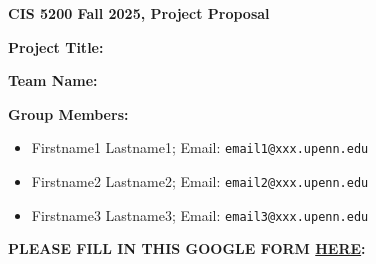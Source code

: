 \documentclass[english]{article}
\begin{document}
\begin{center}
    \textbf{\Large CIS 5200 Fall 2025, Project Proposal}
\end{center}



\vspace{15pt}



\textbf{\Large{Project Title:}}

\vspace{1cm}

\textbf{Team Name:}

\vspace{5mm}

\textbf{Group Members:}

\begin{itemize}
 \item Firstname1 Lastname1; Email: \texttt{email1@xxx.upenn.edu}
 \item Firstname2 Lastname2; Email: \texttt{email2@xxx.upenn.edu}
 \item Firstname3 Lastname3; Email: \texttt{email3@xxx.upenn.edu} 
\end{itemize}

\vspace{8pt}

\textbf{PLEASE FILL IN THIS GOOGLE FORM \href{https://forms.gle/vnLS6B4Szebq8NiN7}{HERE}:}




\vspace{1cm}

\hline


\end{document}
